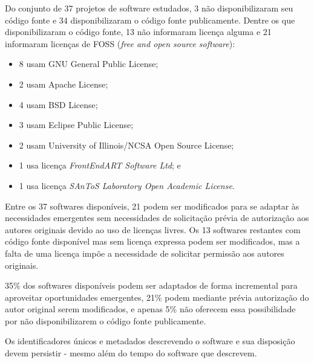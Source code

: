 Do conjunto de 37 projetos de software estudados, %
3 não disponibilizaram seu código fonte e  %
34 disponibilizaram o código fonte publicamente.
Dentre os que disponibilizaram o código fonte, 13 não informaram licença alguma
e 21 informaram licenças de FOSS ({\it free and open source software}):

\begin{itemize}
  \item 8 usam GNU General Public License;
  \item 2 usam Apache License;
  \item 4 usam BSD License;
  \item 3 usam Eclipse Public License;
  \item 2 usam University of Illinois/NCSA Open Source License;
  \item 1 usa licença {\it FrontEndART Software Ltd}; e
  \item 1 usa licença {\it SAnToS Laboratory Open Academic License}.
\end{itemize}

Entre os 37 softwares disponíveis, 21 podem ser modificados para se adaptar às
necessidades emergentes sem necessidades de solicitação prévia de autorização
aos autores originais devido ao uso de licenças livres. 
Os 13 softwares restantes com código fonte disponível mas sem licença expressa podem
ser modificados, mas a falta de uma licença impõe a necessidade
de solicitar permissão aos autores originais.

35\% dos softwares disponíveis podem ser adaptados de forma incremental para
aproveitar oportunidades emergentes, 21\% podem mediante prévia autorização do
autor original serem modificados, e apenas 5\% não oferecem essa possibilidade
por não disponibilizarem o código fonte publicamente.


Os identificadores únicos e metadados descrevendo o software e sua disposição
devem persistir - mesmo além do tempo do software que descrevem.



